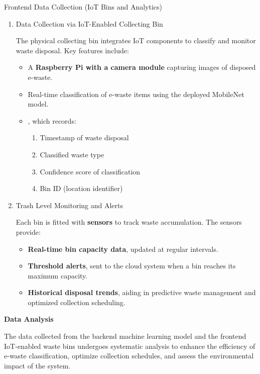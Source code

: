 \noindent Frontend Data Collection (IoT Bins and Analytics)
\begin{enumerate}
	\item Data Collection via IoT-Enabled Collecting Bin \par

	The physical collecting bin integrates IoT components to classify and monitor waste disposal. Key features include: \begin{itemize}
	
		\item A \textbf{Raspberry Pi with a camera module} capturing images of disposed e-waste.
		\item Real-time classification of e-waste items using the deployed MobileNet model.
		\item {}, which records: \begin{enumerate}
			\item Timestamp of waste disposal
			\item Classified waste type
			\item Confidence score of classification
			\item Bin ID (location identifier) 
		\end{enumerate}
	\end{itemize}
	\item Trash Level Monitoring and Alerts

	 Each bin is fitted with \textbf{sensors} to track waste accumulation. The sensors provide: \begin{itemize}
		
		\item \textbf{Real-time bin capacity data}, updated at regular intervals.
		\item \textbf{Threshold alerts}, sent to the cloud system when a bin reaches its maximum capacity.
		\item \textbf{Historical disposal trends}, aiding in predictive waste management and optimized collection scheduling.
	\end{itemize}
\end{enumerate}

\textbf{Data Analysis} 
	
	The data collected from the backend machine learning model and the frontend IoT-enabled waste bins undergoes systematic analysis to enhance the efficiency of e-waste classification, optimize collection schedules, and assess the environmental impact of the system. 

